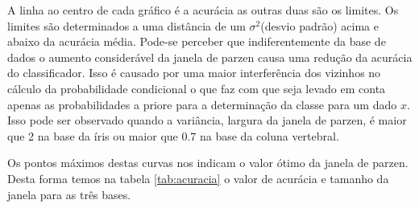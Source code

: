 \documentclass[ 
	article,			%
	11pt,				%
	oneside,			%
	a4paper,			%
	english,			%
	brazil,				%
	]{abntex2}
\begin{document}
A linha ao centro de cada gráfico é a acurácia as outras duas são os limites.
Os limites são determinados a uma distância de um $\sigma^2$(desvio padrão)
acima e abaixo da acurácia média. Pode-se perceber que indiferentemente da base
de dados o aumento considerável da janela de parzen causa uma redução da
acurácia do classificador. Isso é causado por uma maior interferência dos vizinhos no
cálculo da probabilidade condicional o que faz com que seja levado em conta
apenas as probabilidades a priore para a determinação da classe para um dado
$x$. Isso pode ser observado quando a variância, largura da janela de parzen, é
maior que 2 na base da íris ou maior que 0.7 na base da coluna vertebral.

Os pontos máximos destas curvas nos indicam o valor ótimo da janela de parzen.
Desta forma temos na tabela \ref{tab:acuracia} o valor de acurácia e tamanho da
janela para as três bases.
\end{document}
